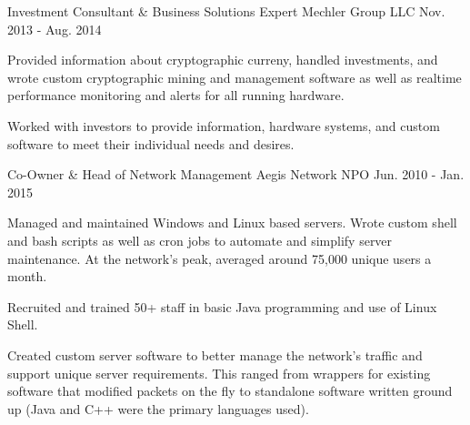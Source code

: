 \begin{cventries}
    \cventry
      {Investment Consultant \& Business Solutions Expert} %
      {Mechler Group LLC} %
      {} %
      {Nov. 2013 - Aug. 2014} %
      {
        \begin{cvitems} %
          \item {Provided information about cryptographic curreny, handled %
          investments, and wrote custom cryptographic mining and management software %
          as well as realtime performance monitoring and alerts for all running %
          hardware.}
          \item {Worked with investors to provide information, %
          hardware systems, and custom software to meet their individual needs %
          and desires.}
        \end{cvitems}
      }

  \cventry
    {Co-Owner \& Head of Network Management} %
    {Aegis Network NPO} %
    {} %
    {Jun. 2010 - Jan. 2015} %
    {
      \begin{cvitems} %
        \item {Managed and maintained Windows and Linux based servers. %
        Wrote custom shell and bash scripts as well as cron jobs to automate %
        and simplify server maintenance. At the network's peak, averaged around %
        75,000 unique users a month.}
        \item {Recruited and trained 50+ staff in basic Java programming and %
        use of Linux Shell.}
        \item {Created custom server software to better manage the network's %
        traffic and support unique server requirements. This ranged from %
        wrappers for existing software that modified packets on the fly to %
        standalone software written ground up (Java and C++ were the primary %
        languages used).}
      \end{cvitems}
    }

\end{cventries}
